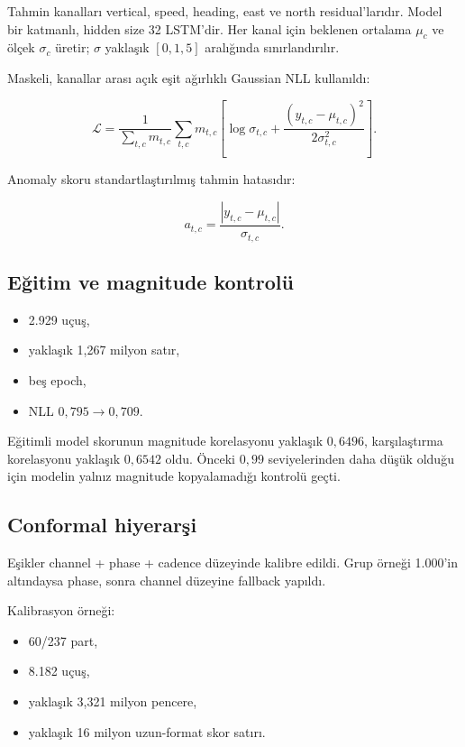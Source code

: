 \documentclass[11pt,a4paper,oneside]{report}
\begin{document}
Tahmin kanalları vertical, speed, heading, east ve north residual'larıdır.
Model bir katmanlı, hidden size 32 LSTM'dir. Her kanal için beklenen ortalama
\(\mu_c\) ve ölçek \(\sigma_c\) üretir; \(\sigma\) yaklaşık
\([0{,}1,5]\) aralığında sınırlandırılır.

Maskeli, kanallar arası açık eşit ağırlıklı Gaussian NLL kullanıldı:

\[
\mathcal{L}
= \frac{1}{\sum_{t,c}m_{t,c}}
\sum_{t,c} m_{t,c}
\left[
\log\sigma_{t,c}
+ \frac{(y_{t,c}-\mu_{t,c})^2}{2\sigma_{t,c}^2}
\right].
\]

Anomaly skoru standartlaştırılmış tahmin hatasıdır:

\[
a_{t,c}
= \frac{|y_{t,c}-\mu_{t,c}|}{\sigma_{t,c}}.
\]

\subsection{Eğitim ve magnitude kontrolü}

\begin{itemize}
  \item 2.929 uçuş,
  \item yaklaşık 1,267 milyon satır,
  \item beş epoch,
  \item NLL \(0{,}795\to0{,}709\).
\end{itemize}

Eğitimli model skorunun magnitude korelasyonu yaklaşık \(0{,}6496\),
karşılaştırma korelasyonu yaklaşık \(0{,}6542\) oldu. Önceki \(0{,}99\)
seviyelerinden daha düşük olduğu için modelin yalnız magnitude kopyalamadığı
kontrolü geçti.

\subsection{Conformal hiyerarşi}

Eşikler channel + phase + cadence düzeyinde kalibre edildi. Grup örneği
1.000'in altındaysa phase, sonra channel düzeyine fallback yapıldı.

Kalibrasyon örneği:

\begin{itemize}
  \item 60/237 part,
  \item 8.182 uçuş,
  \item yaklaşık 3,321 milyon pencere,
  \item yaklaşık 16 milyon uzun-format skor satırı.
\end{itemize}
\end{document}
